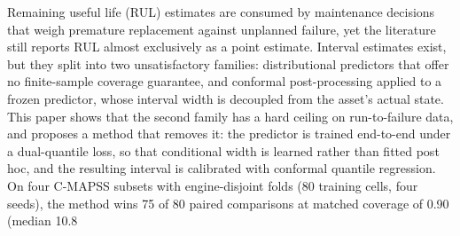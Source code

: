 Remaining useful life (RUL) estimates are consumed by maintenance decisions that weigh premature replacement against unplanned failure, yet the literature still reports RUL almost exclusively as a point estimate. Interval estimates exist, but they split into two unsatisfactory families: distributional predictors that offer no finite-sample coverage guarantee, and conformal post-processing applied to a frozen predictor, whose interval width is decoupled from the asset's actual state. This paper shows that the second family has a hard ceiling on run-to-failure data, and proposes a method that removes it: the predictor is trained end-to-end under a dual-quantile loss, so that conditional width is learned rather than fitted post hoc, and the resulting interval is calibrated with conformal quantile regression. On four C-MAPSS subsets with engine-disjoint folds (80 training cells, four seeds), the method wins 75 of 80 paired comparisons at matched coverage of 0.90 (median 10.8\\%
